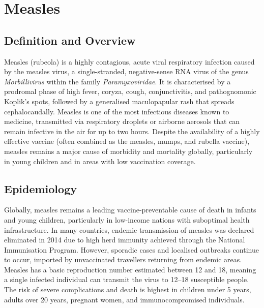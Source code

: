 \chapter{Measles}

\section*{Definition and Overview}
Measles (rubeola) is a highly contagious, acute viral respiratory infection caused by the measles virus, a single-stranded, negative-sense RNA virus of the genus \textit{Morbillivirus} within the family \textit{Paramyxoviridae}. It is characterised by a prodromal phase of high fever, coryza, cough, conjunctivitis, and pathognomonic Koplik's spots, followed by a generalised maculopapular rash that spreads cephalocaudally. Measles is one of the most infectious diseases known to medicine, transmitted via respiratory droplets or airborne aerosols that can remain infective in the air for up to two hours. Despite the availability of a highly effective vaccine (often combined as the measles, mumps, and rubella vaccine), measles remains a major cause of morbidity and mortality globally, particularly in young children and in areas with low vaccination coverage.

\section*{Epidemiology}
Globally, measles remains a leading vaccine-preventable cause of death in infants and young children, particularly in low-income nations with suboptimal health infrastructure. In many countries, endemic transmission of measles was declared eliminated in 2014 due to high herd immunity achieved through the National Immunisation Program. However, sporadic cases and localised outbreaks continue to occur, imported by unvaccinated travellers returning from endemic areas. Measles has a basic reproduction number estimated between 12 and 18, meaning a single infected individual can transmit the virus to 12--18 susceptible people. The risk of severe complications and death is highest in children under 5 years, adults over 20 years, pregnant women, and immunocompromised individuals.

